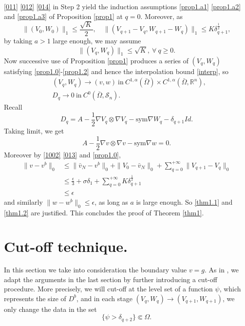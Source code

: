 \documentclass[reqno,12pt]{amsart}
\numberwithin{equation}{section}
\theoremstyle{plain}
\theoremstyle{definition}
\newcommand{\R}{\mathbb{R}}
\renewcommand{\S}{{\mathcal{S}_n}}
\newcommand{\sym}{\text{sym}}
\begin{document}
\eqref{011} \eqref{012} \eqref{014} in Step 2 yield the induction assumptions \eqref{prop1.a1} \eqref{prop1.a2} and \eqref{prop1.a3} of Proposition \ref{prop1} at $q=0$. Moreover, as
\begin{equation*}
    \|(V_0,W_0)\|_1\le \frac{\sqrt{K}}{2},\quad
    \|(V_{q+1}-V_q, W_{q+1}-W_q)\|_1\le K\delta_{q+1}^\frac{1}{2},
\end{equation*}
by taking $a>1$ large enough, we may assume
\begin{equation*}
    \|(V_q,W_q)\|_1\le \sqrt{K},\ \forall\ q\ge 0.
\end{equation*}
Now successive use of Proposition \ref{prop1} produces a series of $(V_q,W_q)$ satisfying \eqref{prop1.0}-\eqref{prop1.2} and hence the interpolation bound \eqref{interp}, so
\begin{align*}
    &(V_q,W_q)\to (v,w)\ \text{in}\ C^{1,\alpha}(\bar\Omega)\times C^{1,\alpha}(\bar\Omega,\R^n),\\
    &D_q\to 0\ \text{in}\ C^0(\bar\Omega,\S).
\end{align*}
Recall
\begin{equation*}
    D_q=A-\frac{1}{2}\nabla V_q\otimes\nabla V_q-\sym\nabla W_q-\delta_{q+1}Id.
\end{equation*}
Taking limit, we get
\begin{equation*}
    A-\frac{1}{2}\nabla v\otimes\nabla v-\sym\nabla w=0.
\end{equation*}
Moreover by \eqref{1002} \eqref{013} and \eqref{prop1.0},
\begin{align*}
    \|v-v^b\|_0
    &\le \|\bar v_N-v^b\|_0+\|V_0-\bar v_N\|_0+\sum_{q=0}^{+\infty}\|V_{q+1}-V_q\|_0\\
    &\le \frac{\epsilon}{3}+\sigma\delta_1+\sum_{q=0}^{+\infty}K\delta_{q+1}^\frac{1}{2}\\
    &\le \epsilon
\end{align*}
and similarly $\|w-w^b\|_0\le\epsilon$, as long as $a$ is large enough. So \eqref{thm1.1} and \eqref{thm1.2} are justified. This concludes the proof of Theorem \ref{thm1}.


\section{Cut-off technique.}\label{sec2}
In this section we take into consideration the boundary value $v=g$. As in \cite{cao23dirichlet}, we adapt the arguments in the last section by further introducing a cut-off procedure. More precisely, we will cut-off at the level set of a function $\psi$, which represents the size of $D^b$, and in each stage $(V_q,W_q)\to(V_{q+1},W_{q+1})$, we only change the data in the set
\begin{equation*}
    \{\psi>\delta_{q+2}\}\Subset\Omega.
\end{equation*}
\end{document}
